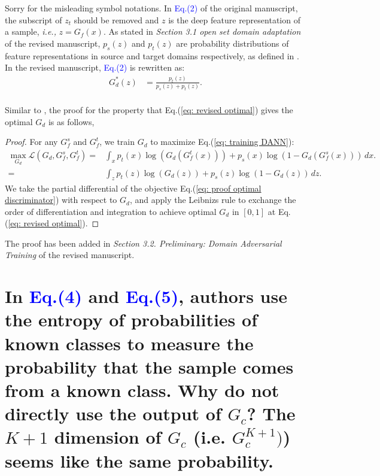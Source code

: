 Sorry for the misleading symbol notations. 
In \textcolor{blue}{Eq.(2)} of the original manuscript, the subscript of $z_t$ should be removed and $z$ is the deep feature representation of a sample, \textit{i.e.,} $z=G_f(x).$
As stated in \textit{Section 3.1 open set domain adaptation} of the revised manuscript, $p_s (z)$ and $p_t (z)$ are probability distributions of feature representations in source and target domains respectively, as defined in \cite{PartialDA-iw}.
In the revised manuscript, \textcolor{blue}{Eq.(2)} is rewritten as:
\begin{equation}
    \label{eq: revised optimal}
    \begin{split}
        G_d^*(z) &= \frac{p_t(z)}{p_s(z)+p_t(z)}. \\
    \end{split}
\end{equation}

Similar to \cite{goodfellow2014generative}, the proof for the property that Eq.(\ref{eq: revised optimal}) gives the optimal $G_d$ is as follows,
\begin{proof}
    For any $G_f^s$ and $G_f^t$, we train $G_d$ to maximize Eq.(\ref{eq: training DANN}):
    \begin{equation}
        \label{eq: proof optimal discriminator}
        \begin{split}
            \max_{G_d} \mathscr{L}(G_d,G^{s}_{f},G_f^t)  = &\int_x p_t(x)\log \left(G_d\left(G_f^t\left(x\right)\right)\right)
              + p_s(x) \log\left(1-G_d\left(G_f^s\left(x\right)\right)\right) \, dx.
            \\ = &\int_z p_t(z)\log \left(G_d\left(z\right)\right)
              + p_s(z) \log\left(1-G_d\left(z\right)\right) \, dz.
        \end{split}
    \end{equation}
    We take the partial differential of the objective Eq.(\ref{eq: proof optimal discriminator}) with respect to $G_d$, and apply the Leibnizs rule to exchange the order of differentiation and integration to achieve optimal $G_d$ in $[0, 1]$ at Eq.(\ref{eq: revised optimal}).
\end{proof}

The proof has been added in \textit{Section 3.2. Preliminary: Domain Adversarial Training} of the revised manuscript.

\section{In \textcolor{blue}{Eq.(4)} and \textcolor{blue}{Eq.(5)}, authors use the entropy of probabilities of known classes to measure the probability that the sample comes from a known class. Why do not directly use the output of $G_c$? The $K+1$ dimension of $G_c$  (i.e. $G_c^{K+1})$) seems like the same probability. }

